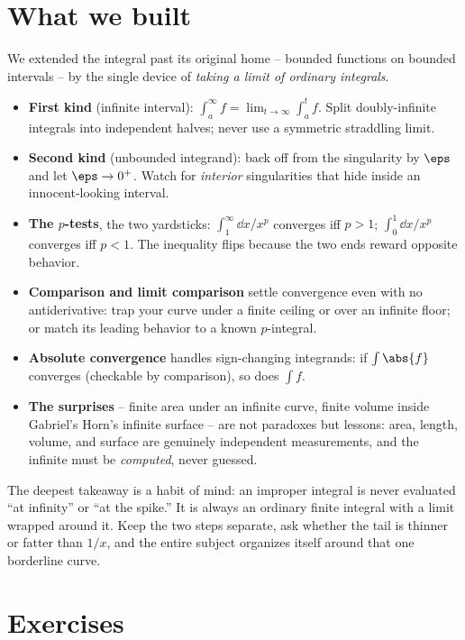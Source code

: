 \section{What we built}
\label{ch25:summary}

We extended the integral past its original home -- bounded functions on bounded
intervals -- by the single device of \emph{taking a limit of ordinary integrals}.

\begin{itemize}
  \item \textbf{First kind} (infinite interval):
  $\int_a^\infty f = \lim_{t\to\infty}\int_a^t f$. Split doubly-infinite integrals
  into independent halves; never use a symmetric straddling limit.
  \item \textbf{Second kind} (unbounded integrand): back off from the singularity
  by $\eps$ and let $\eps\to 0^+$. Watch for \emph{interior} singularities that
  hide inside an innocent-looking interval.
  \item \textbf{The $p$-tests}, the two yardsticks: $\int_1^\infty \dd x/x^p$
  converges iff $p>1$; $\int_0^1 \dd x/x^p$ converges iff $p<1$. The inequality
  flips because the two ends reward opposite behavior.
  \item \textbf{Comparison and limit comparison} settle convergence even with no
  antiderivative: trap your curve under a finite ceiling or over an infinite floor;
  or match its leading behavior to a known $p$-integral.
  \item \textbf{Absolute convergence} handles sign-changing integrands: if
  $\int\abs{f}$ converges (checkable by comparison), so does $\int f$.
  \item \textbf{The surprises} -- finite area under an infinite curve, finite
  volume inside Gabriel's Horn's infinite surface -- are not paradoxes but lessons:
  area, length, volume, and surface are genuinely independent measurements, and the
  infinite must be \emph{computed}, never guessed.
\end{itemize}

The deepest takeaway is a habit of mind: an improper integral is never evaluated
``at infinity'' or ``at the spike.'' It is always an ordinary finite integral with a
limit wrapped around it. Keep the two steps separate, ask whether the tail is
thinner or fatter than $1/x$, and the entire subject organizes itself around that
one borderline curve.

\chapterline

\section{Exercises}
\label{ch25:exercises}

